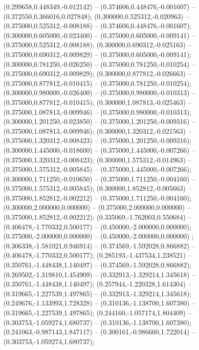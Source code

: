 (0.299658,0.448349,-0.012142) -- (0.374606,0.448476,-0.001607) -- (0.372550,0.366016,0.027848);
 (0.300000,0.525312,-0.020963) -- (0.375000,0.525312,-0.008188) -- (0.374606,0.448476,-0.001607);
 (0.300000,0.605000,-0.023400) -- (0.375000,0.605000,-0.009141) -- (0.375000,0.525312,-0.008188);
 (0.300000,0.690312,-0.025163) -- (0.375000,0.690312,-0.009829) -- (0.375000,0.605000,-0.009141);
 (0.300000,0.781250,-0.026250) -- (0.375000,0.781250,-0.010254) -- (0.375000,0.690312,-0.009829);
 (0.300000,0.877812,-0.026663) -- (0.375000,0.877812,-0.010415) -- (0.375000,0.781250,-0.010254);
 (0.300000,0.980000,-0.026400) -- (0.375000,0.980000,-0.010313) -- (0.375000,0.877812,-0.010415);
 (0.300000,1.087813,-0.025463) -- (0.375000,1.087813,-0.009946) -- (0.375000,0.980000,-0.010313);
 (0.300000,1.201250,-0.023850) -- (0.375000,1.201250,-0.009316) -- (0.375000,1.087813,-0.009946);
 (0.300000,1.320312,-0.021563) -- (0.375000,1.320312,-0.008423) -- (0.375000,1.201250,-0.009316);
 (0.300000,1.445000,-0.018600) -- (0.375000,1.445000,-0.007266) -- (0.375000,1.320312,-0.008423);
 (0.300000,1.575312,-0.014963) -- (0.375000,1.575312,-0.005845) -- (0.375000,1.445000,-0.007266);
 (0.300000,1.711250,-0.010650) -- (0.375000,1.711250,-0.004160) -- (0.375000,1.575312,-0.005845);
 (0.300000,1.852812,-0.005663) -- (0.375000,1.852812,-0.002212) -- (0.375000,1.711250,-0.004160);
 (0.300000,2.000000,0.000000) -- (0.375000,2.000000,0.000000) -- (0.375000,1.852812,-0.002212);
 (0.335069,-1.762003,0.550684) -- (0.406478,-1.770332,0.500177) -- (0.450000,-2.000000,0.000000);
 (0.375000,-2.000000,0.000000) -- (0.450000,-2.000000,0.000000) ;
 (0.306338,-1.581021,0.946914) -- (0.374569,-1.592028,0.866882) -- (0.406478,-1.770332,0.500177);
 (0.285193,-1.437534,1.238521) -- (0.350761,-1.448438,1.140497) -- (0.374569,-1.592028,0.866882);
 (0.269502,-1.319810,1.454909) -- (0.332913,-1.329214,1.345618) -- (0.350761,-1.448438,1.140497);
 (0.257944,-1.220328,1.614304) -- (0.319665,-1.227539,1.497865) -- (0.332913,-1.329214,1.345618);
 (0.249676,-1.133993,1.728328) -- (0.310136,-1.138700,1.607380) -- (0.319665,-1.227539,1.497865);
 (0.244160,-1.057174,1.804409) -- (0.303753,-1.059274,1.680737) -- (0.310136,-1.138700,1.607380);
 (0.241063,-0.987143,1.847117) -- (0.300161,-0.986660,1.722014) -- (0.303753,-1.059274,1.680737);
